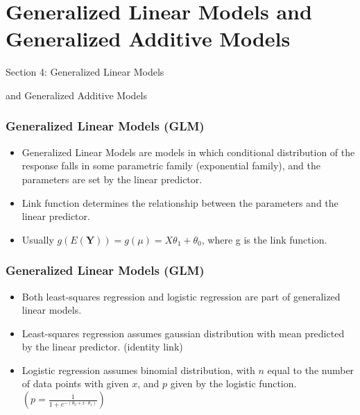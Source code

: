 \section{Generalized Linear Models and Generalized Additive Models}
\begin{frame}
\huge{\centerline{Section 4: Generalized Linear Models }}
\huge{\centerline{and Generalized Additive Models}}
\end{frame}

\begin{frame}
\frametitle{Generalized Linear Models (GLM)}
\begin{itemize}
\item Generalized Linear Models are models in which conditional distribution of the response falls in some parametric family (exponential family), and the parameters are set by the linear predictor.
\item Link function determines the relationship between the parameters and the linear predictor.
\item Usually $g(E(\textbf{Y}))=g(\textbf{$\mu$})=\textbf{$X$}\textbf{$\theta_1$}+\textbf{$\theta_0$}$, where g is the link function.
\end{itemize}
\end{frame}

\begin{frame}
\frametitle{Generalized Linear Models (GLM) }
\begin{itemize}
\item Both least-squares regression and logistic regression are part of generalized linear models. 
\item Least-squares regression assumes gaussian distribution with mean predicted by the linear predictor. (identity link)
\item Logistic regression assumes binomial distribution, with $n$ equal to the number of data points with given $x$, and $p$ given by the logistic function. $(p=\frac{1}{1+e^{-(\theta_0+x \cdot \theta_1)}})$
\end{itemize}
\end{frame}



